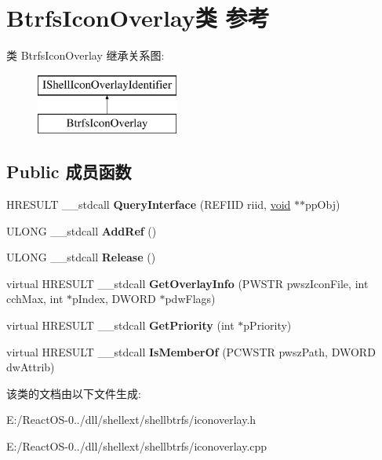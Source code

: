 \hypertarget{class_btrfs_icon_overlay}{}\section{Btrfs\+Icon\+Overlay类 参考}
\label{class_btrfs_icon_overlay}
类 Btrfs\+Icon\+Overlay 继承关系图\+:\begin{figure}[H]
\begin{center}
\leavevmode
\includegraphics[height=2.000000cm]{class_btrfs_icon_overlay}
\end{center}
\end{figure}
\subsection*{Public 成员函数}
\begin{DoxyCompactItemize}
\item 
\mbox{\label{class_btrfs_icon_overlay_adb575f04302b47a5da7754110a11ecd0}} 
H\+R\+E\+S\+U\+LT \+\_\+\+\_\+stdcall {\bfseries Query\+Interface} (R\+E\+F\+I\+ID riid, \hyperlink{interfacevoid}{void} $\ast$$\ast$pp\+Obj)
\item 
\mbox{\label{class_btrfs_icon_overlay_a3dc3fd723777ec5bf8098f98c2124541}} 
U\+L\+O\+NG \+\_\+\+\_\+stdcall {\bfseries Add\+Ref} ()
\item 
\mbox{\label{class_btrfs_icon_overlay_a6b5e4862c49c2f7a0d016f9b6346d09b}} 
U\+L\+O\+NG \+\_\+\+\_\+stdcall {\bfseries Release} ()
\item 
\mbox{\label{class_btrfs_icon_overlay_acd0ae340d1303ae692ee0486bf4be463}} 
virtual H\+R\+E\+S\+U\+LT \+\_\+\+\_\+stdcall {\bfseries Get\+Overlay\+Info} (P\+W\+S\+TR pwsz\+Icon\+File, int cch\+Max, int $\ast$p\+Index, D\+W\+O\+RD $\ast$pdw\+Flags)
\item 
\mbox{\label{class_btrfs_icon_overlay_af3617cfe9c272d77b17aa0c0c7db12ca}} 
virtual H\+R\+E\+S\+U\+LT \+\_\+\+\_\+stdcall {\bfseries Get\+Priority} (int $\ast$p\+Priority)
\item 
\mbox{\label{class_btrfs_icon_overlay_af8bf5d8afe91480d6a58133848ad8162}} 
virtual H\+R\+E\+S\+U\+LT \+\_\+\+\_\+stdcall {\bfseries Is\+Member\+Of} (P\+C\+W\+S\+TR pwsz\+Path, D\+W\+O\+RD dw\+Attrib)
\end{DoxyCompactItemize}


该类的文档由以下文件生成\+:\begin{DoxyCompactItemize}
\item 
E\+:/\+React\+O\+S-\/0../dll/shellext/shellbtrfs/iconoverlay.\+h\item 
E\+:/\+React\+O\+S-\/0../dll/shellext/shellbtrfs/iconoverlay.\+cpp\end{DoxyCompactItemize}
